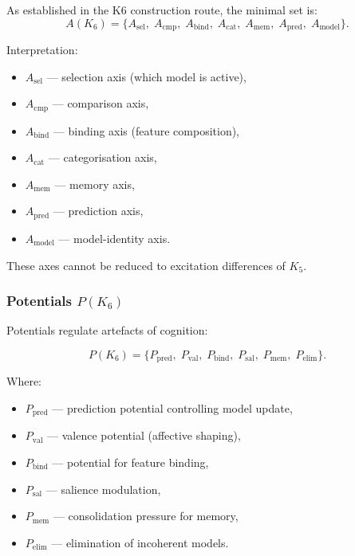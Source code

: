 As established in the K6 construction route, the minimal set is:
\[
A(K_6) = \{
A_{\mathrm{sel}},\;
A_{\mathrm{cmp}},\;
A_{\mathrm{bind}},\;
A_{\mathrm{cat}},\;
A_{\mathrm{mem}},\;
A_{\mathrm{pred}},\;
A_{\mathrm{model}}
\}.
\]

Interpretation:
\begin{itemize}
    \item $A_{\mathrm{sel}}$ — selection axis (which model is active),
    \item $A_{\mathrm{cmp}}$ — comparison axis,
    \item $A_{\mathrm{bind}}$ — binding axis (feature composition),
    \item $A_{\mathrm{cat}}$ — categorisation axis,
    \item $A_{\mathrm{mem}}$ — memory axis,
    \item $A_{\mathrm{pred}}$ — prediction axis,
    \item $A_{\mathrm{model}}$ — model-identity axis.
\end{itemize}

These axes cannot be reduced to excitation differences of $K_5$.

\subsubsection{Potentials \texorpdfstring{$P(K_6)$}{P(K_6)}}

Potentials regulate artefacts of cognition:

\[
P(K_6)=
\{
P_{\mathrm{pred}},\;
P_{\mathrm{val}},\;
P_{\mathrm{bind}},\;
P_{\mathrm{sal}},\;
P_{\mathrm{mem}},\;
P_{\mathrm{elim}}
\}.
\]

Where:
\begin{itemize}
    \item $P_{\mathrm{pred}}$ — prediction potential controlling model update,
    \item $P_{\mathrm{val}}$ — valence potential (affective shaping),
    \item $P_{\mathrm{bind}}$ — potential for feature binding,
    \item $P_{\mathrm{sal}}$ — salience modulation,
    \item $P_{\mathrm{mem}}$ — consolidation pressure for memory,
    \item $P_{\mathrm{elim}}$ — elimination of incoherent models.
\end{itemize}

